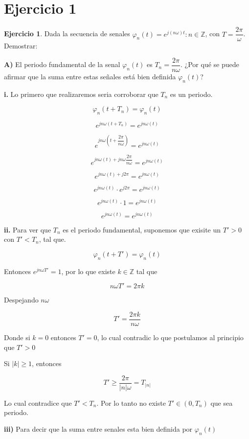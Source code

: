 \chapter{Ejercicio 1}

\textbf{Ejercicio 1}. Dada la secuencia de senales {$\varphi_{n} (t)=e^{j(n\omega)t}: n \in \mathbb{Z}$}, con $T = \dfrac{2\pi}{\omega}$. Demostrar:

\textbf{A)} El periodo fundamental de la senal $\varphi_{n}(t)$ es $T_n=\dfrac{2\pi}{n\omega}$. ¿Por qué se puede afirmar que la suma entre estas señales está bien definida $\varphi_{n}(t)$?

\textbf{i.} Lo primero que realizaremos seria corroborar que $T_n$ es un periodo.

$$\varphi_{n}(t+T_n)=\varphi_{n}(t)$$

$$e^{jn\omega(t+T_n)}=e^{jn\omega(t)}$$

$$e^{jn\omega(t+\dfrac{2\pi}{n\omega})}=e^{jn\omega(t)}$$

$$e^{jn\omega(t)+jn\omega\dfrac{2\pi}{n\omega}}=e^{jn\omega(t)}$$

$$e^{jn\omega(t)+j2\pi}=e^{jn\omega(t)}$$

$$e^{jn\omega(t)} \cdot e^{j2\pi} = e^{jn\omega(t)}$$

$$e^{jn\omega(t)} \cdot 1 = e^{jn\omega(t)}$$

$$e^{jn\omega(t)} = e^{jn\omega(t)}$$

\textbf{ii.} Para ver que $T_n$ es el periodo fundamental, suponemos que exisite un $T'>0$ con $T'<T_n$, tal que.

$$\varphi_n(t+T')=\varphi_n(t)$$

Entonces $e^{jn\omega T'} = 1$, por lo que existe $k \in \mathbb{Z}$ tal que

$$n\omega T'= 2\pi k$$

Despejando $n\omega$

$$T'=\dfrac{2\pi k}{n\omega}$$

Donde si $k=0$ entonces $T'=0$, lo cual contradic lo que postulamos al principio que $T'>0$

Si $|k| \ge 1$, entonces

$$T' \ge \dfrac{2\pi}{|n|\omega} = T_{|n|}$$

Lo cual contradice que $T'<T_n$. Por lo tanto no existe $T'\in(0,T_n)$ que sea periodo.

\textbf{iii)} Para decir que la suma entre senales esta bien definida por $\varphi_n(t)$



